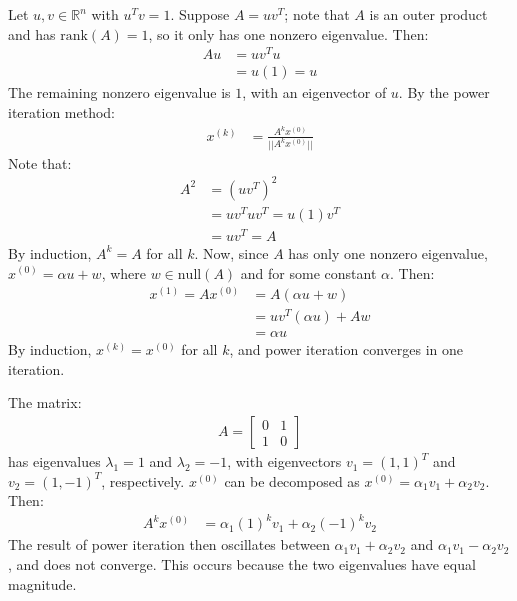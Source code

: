 \documentclass{article}
\begin{document}
\clearpage
\problem{}
Let $u, v \in \mathbb{R}^n$ with $u^T v = 1$. Suppose $A = uv^T$; note that $A$ is an outer product and has $\mathrm{rank}(A) = 1$, so it only has one nonzero eigenvalue. Then:
\begin{align*}
    Au & = uv^T u \\
    & = u(1) = u
\end{align*}
The remaining nonzero eigenvalue is $1$, with an eigenvector of $u$.
By the power iteration method:
\begin{align*}
    x^{(k)} & = \frac{A^k x^{(0)}}{||A^k x^{(0)}||}
\end{align*}
Note that:
\begin{align*}
    A^2 & = {(uv^T)}^2 \\
    & = uv^T u v^T = u(1)v^T \\
    & = uv^T = A
\end{align*}
By induction, $A^k = A$ for all $k$. Now, since $A$ has only one nonzero eigenvalue, $x^{(0)} = \alpha u + w$, where $w \in \mathrm{null}(A)$ and for some constant $\alpha$. Then:
\begin{align*}
    x^{(1)} = Ax^{(0)} & = A(\alpha u + w) \\
    & = uv^T(\alpha u) + Aw \\
    & = \alpha u
\end{align*}
By induction, $x^{(k)} = x^{(0)}$ for all $k$, and power iteration converges in one iteration.

\clearpage
\problem{}
The matrix:
\begin{align*}
    A = \begin{bmatrix}
        0 & 1 \\ 1 & 0
    \end{bmatrix}
\end{align*}
has eigenvalues $\lambda_1 = 1$ and $\lambda_2 = -1$, with eigenvectors $v_1 = {(1, 1)}^T$ and $v_2 = {(1, -1)}^T$, respectively. $x^{(0)}$ can be decomposed as $x^{(0)} = \alpha_1 v_1 + \alpha_2 v_2$. Then:
\begin{align*}
    A^k x^{(0)} & = \alpha_1{(1)}^k v_1 + \alpha_2{(-1)}^k v_2
\end{align*}
The result of power iteration then oscillates between $\alpha_1 v_1 + \alpha_2 v_2$ and $\alpha_1 v_1 - \alpha_2 v_2$, and does not converge. This occurs because the two eigenvalues have equal magnitude.
\end{document}
